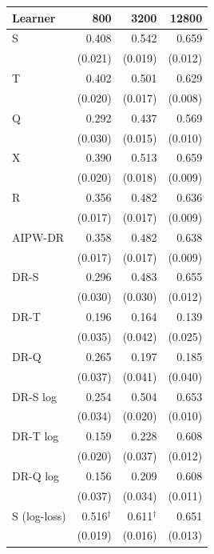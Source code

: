 \begin{tabular}{l|rrr}
\hline
Learner & 800 & 3200 & 12800 \\
\hline
S & 0.408 & 0.542 & 0.659 \\
 & \scriptsize (0.021) & \scriptsize (0.019) & \scriptsize (0.012) \\[2pt]
T & 0.402 & 0.501 & 0.629 \\
 & \scriptsize (0.020) & \scriptsize (0.017) & \scriptsize (0.008) \\[2pt]
\hline
Q & 0.292 & 0.437 & 0.569 \\
 & \scriptsize (0.030) & \scriptsize (0.015) & \scriptsize (0.010) \\[2pt]
\hline
X & 0.390 & 0.513 & 0.659 \\
 & \scriptsize (0.020) & \scriptsize (0.018) & \scriptsize (0.009) \\[2pt]
R & 0.356 & 0.482 & 0.636 \\
 & \scriptsize (0.017) & \scriptsize (0.017) & \scriptsize (0.009) \\[2pt]
AIPW-DR & 0.358 & 0.482 & 0.638 \\
 & \scriptsize (0.017) & \scriptsize (0.017) & \scriptsize (0.009) \\[2pt]
\hline
DR-S & 0.296 & 0.483 & 0.655 \\
 & \scriptsize (0.030) & \scriptsize (0.030) & \scriptsize (0.012) \\[2pt]
DR-T & 0.196 & 0.164 & 0.139 \\
 & \scriptsize (0.035) & \scriptsize (0.042) & \scriptsize (0.025) \\[2pt]
DR-Q & 0.265 & 0.197 & 0.185 \\
 & \scriptsize (0.037) & \scriptsize (0.041) & \scriptsize (0.040) \\[2pt]
\hline
DR-S log & 0.254 & 0.504 & 0.653 \\
 & \scriptsize (0.034) & \scriptsize (0.020) & \scriptsize (0.010) \\[2pt]
DR-T log & 0.159 & 0.228 & 0.608 \\
 & \scriptsize (0.020) & \scriptsize (0.037) & \scriptsize (0.012) \\[2pt]
DR-Q log & 0.156 & 0.209 & 0.608 \\
 & \scriptsize (0.037) & \scriptsize (0.034) & \scriptsize (0.011) \\[2pt]
\hline
S (log-loss) & 0.516$^\dagger$ & 0.611$^\dagger$ & 0.651 \\
 & \scriptsize (0.019) & \scriptsize (0.016) & \scriptsize (0.013) \\[2pt]

\end{tabular}
